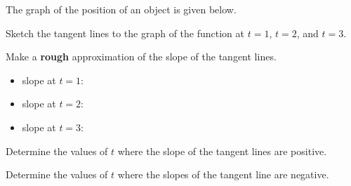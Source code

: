 \begin{problem}
\item The graph of the position of an object is given below.

  \scalebox{0.6}{}

  \begin{subproblem}
  \item Sketch the tangent lines to the graph of the function at
    $t=1$, $t=2$, and $t=3$.
  \item Make a \textbf{rough} approximation of the slope of the tangent lines.
    \begin{itemize}
    \item slope at $t=1$:
    \item slope at $t=2$:
    \item slope at $t=3$:
    \end{itemize}
  \item Determine the values of $t$ where the slope of the tangent
    lines are positive.
    \vfill
  \item Determine the values of $t$ where the slopes of the tangent
    line are negative.
    \vfill
  \end{subproblem}

\end{problem}


